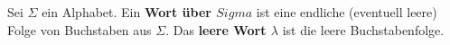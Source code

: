 %
%
Sei \(\Sigma\) ein Alphabet. Ein \textbf{Wort über \(Sigma\)} ist eine endliche (eventuell leere) Folge von Buchstaben aus \(\Sigma\). Das \textbf{leere Wort \(\lambda\)} ist die leere Buchstabenfolge.
